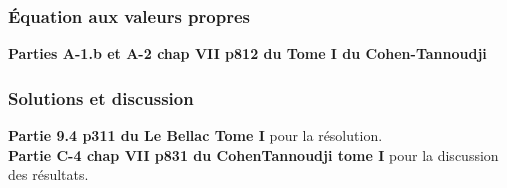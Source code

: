 \documentclass[12pt,prb,aps,epsf]{article}
\begin{document}
\subsubsection{Équation aux valeurs propres}
\textbf{Parties A-1.b et A-2 chap VII p812 du Tome I du Cohen-Tannoudji}

\subsubsection{Solutions et discussion}
\textbf{Partie 9.4 p311 du Le Bellac Tome I} pour la résolution.\\
\textbf{Partie C-4 chap VII p831 du CohenTannoudji tome I} pour la discussion des résultats.
	
\end{document}
